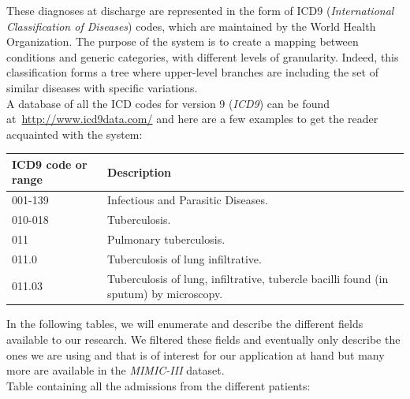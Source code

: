 These diagnoses at discharge are represented in the form of ICD9 (\textit{International Classification of Diseases}) codes, which are maintained by the World Health Organization. The purpose of the system is to create a mapping between conditions and generic categories, with different levels of granularity. Indeed, this classification forms a tree where upper-level branches are including the set of similar diseases with specific variations. \\

A database of all the ICD codes for version 9 (\textit{ICD9}) can be found at~\url{http://www.icd9data.com/} and here are a few examples to get the reader acquainted with the system:

\begin{table}[H]
 \begin{center}
  \begin{tabular}{ l | p{7cm} }
   \textbf{ICD9 code or range} & \textbf{Description} \\ \hline
   001-139 & Infectious and Parasitic Diseases. \\ \hline
   010-018 & Tuberculosis. \\ \hline
   011 & Pulmonary tuberculosis. \\ \hline
   011.0 & Tuberculosis of lung infiltrative. \\ \hline
   011.03 & Tuberculosis of lung, infiltrative, tubercle bacilli found (in sputum) by microscopy. \\
   \hline
  \end{tabular}
 \end{center}
\end{table}

In the following tables, we will enumerate and describe the different fields available to our research. We filtered these fields and eventually only describe the ones we are using and that is of interest for our application at hand but many more are available in the \textit{MIMIC-III} dataset. \\

Table containing all the admissions from the different patients:


